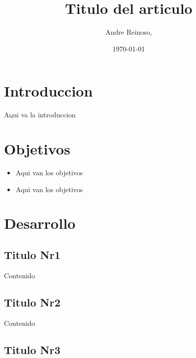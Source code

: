 \documentclass[twoside,twocolumn]{article}
\title{Titulo del articulo}
\author{Andre Reinoso, }
\date{\today}
\begin{document}
\maketitle


\section{Introduccion}
\lettrine[nindent=0em,lines=3]{A}qui va la introduccion



\section{Objetivos}

\begin{itemize}
\item Aqui van los objetivos
\item Aqui van los objetivos

\end{itemize}




\section{Desarrollo}

\subsection{Titulo Nr1}

Contenido

\subsection{Titulo Nr2}

Contenido

\subsection{Titulo Nr3}
\end{document}
